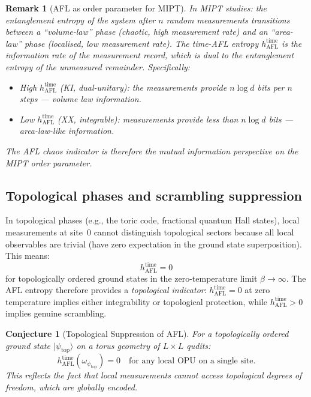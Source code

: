 \documentclass[12pt,a4paper]{article}
\newtheorem{remark}[theorem]{Remark}
\newtheorem{conjecture}[theorem]{Conjecture}
\begin{document}
\begin{remark}[AFL as order parameter for MIPT]
In MIPT studies: the entanglement entropy of the system after $n$ random
measurements transitions between a ``volume-law'' phase (chaotic, high
measurement rate) and an ``area-law'' phase (localised, low measurement
rate).  The time-AFL entropy $h_{\mathrm{AFL}}^{\mathrm{time}}$ is the
\emph{information rate} of the measurement record, which is dual to the
entanglement entropy of the unmeasured remainder.  Specifically:
\begin{itemize}
\item High $h_{\mathrm{AFL}}^{\mathrm{time}}$ (KI, dual-unitary): the
  measurements provide $n\log d$ bits per $n$ steps --- volume law information.
\item Low $h_{\mathrm{AFL}}^{\mathrm{time}}$ (XX, integrable): measurements
  provide less than $n\log d$ bits --- area-law-like information.
\end{itemize}
The AFL chaos indicator is therefore the \emph{mutual information} perspective
on the MIPT order parameter.
\end{remark}

\subsection{Topological phases and scrambling suppression}

In topological phases (e.g., the toric code, fractional quantum Hall states),
local measurements at site~$0$ cannot distinguish topological sectors because
all local observables are trivial (have zero expectation in the ground state
superposition).  This means:
\[
  h_{\mathrm{AFL}}^{\mathrm{time}} = 0
\]
for topologically ordered ground states in the zero-temperature limit
$\beta\to\infty$.  The AFL entropy therefore provides a \emph{topological
indicator}: $h_{\mathrm{AFL}}^{\mathrm{time}} = 0$ at zero temperature
implies either integrability or topological protection, while
$h_{\mathrm{AFL}}^{\mathrm{time}} > 0$ implies genuine scrambling.

\begin{conjecture}[Topological Suppression of AFL]
\label{conj:topo}
For a topologically ordered ground state $|\psi_{\mathrm{top}}\rangle$
on a torus geometry of $L\times L$ qudits:
\[
  h_{\mathrm{AFL}}^{\mathrm{time}}(\omega_{\psi_{\mathrm{top}}})
  = 0 \quad\text{for any local OPU on a single site.}
\]
This reflects the fact that local measurements cannot access topological
degrees of freedom, which are globally encoded.
\end{conjecture}
\end{document}
